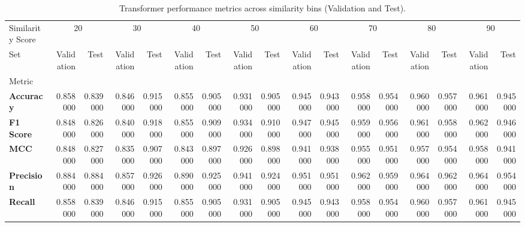 \begin{table}
\caption{Transformer performance metrics across similarity bins (Validation and Test).}
\label{tab:transformer_metrics}
\begin{tabular}{lrrrrrrrrrrrrrrrr}
\toprule
Similarity Score & \multicolumn{2}{c}{20} & \multicolumn{2}{c}{30} & \multicolumn{2}{c}{40} & \multicolumn{2}{c}{50} & \multicolumn{2}{c}{60} & \multicolumn{2}{c}{70} & \multicolumn{2}{c}{80} & \multicolumn{2}{c}{90} \\
Set & Validation & Test & Validation & Test & Validation & Test & Validation & Test & Validation & Test & Validation & Test & Validation & Test & Validation & Test \\
Metric &  &  &  &  &  &  &  &  &  &  &  &  &  &  &  &  \\
\midrule
\textbf{Accuracy} & 0.858000 & 0.839000 & 0.846000 & 0.915000 & 0.855000 & 0.905000 & 0.931000 & 0.905000 & 0.945000 & 0.943000 & 0.958000 & 0.954000 & 0.960000 & 0.957000 & 0.961000 & 0.945000 \\
\textbf{F1 Score} & 0.848000 & 0.826000 & 0.840000 & 0.918000 & 0.855000 & 0.909000 & 0.934000 & 0.910000 & 0.947000 & 0.945000 & 0.959000 & 0.956000 & 0.961000 & 0.958000 & 0.962000 & 0.946000 \\
\textbf{MCC} & 0.848000 & 0.827000 & 0.835000 & 0.907000 & 0.843000 & 0.897000 & 0.926000 & 0.898000 & 0.941000 & 0.938000 & 0.955000 & 0.951000 & 0.957000 & 0.954000 & 0.958000 & 0.941000 \\
\textbf{Precision} & 0.884000 & 0.884000 & 0.857000 & 0.926000 & 0.890000 & 0.925000 & 0.941000 & 0.924000 & 0.951000 & 0.951000 & 0.962000 & 0.959000 & 0.964000 & 0.962000 & 0.964000 & 0.954000 \\
\textbf{Recall} & 0.858000 & 0.839000 & 0.846000 & 0.915000 & 0.855000 & 0.905000 & 0.931000 & 0.905000 & 0.945000 & 0.943000 & 0.958000 & 0.954000 & 0.960000 & 0.957000 & 0.961000 & 0.945000 \\
\bottomrule
\end{tabular}
\end{table}

